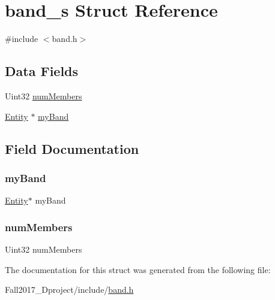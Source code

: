 \hypertarget{structband__s}{}\section{band\+\_\+s Struct Reference}
\label{structband__s}


{\ttfamily \#include $<$band.\+h$>$}

\subsection*{Data Fields}
\begin{DoxyCompactItemize}
\item 
Uint32 \hyperlink{structband__s_a9dbdd428ed64607e0c0fc9eedbf396b8}{num\+Members}
\item 
\hyperlink{entity__s_8h_a603076735282b0b83df7e6ecd290f875}{Entity} $\ast$ \hyperlink{structband__s_a4fe5b3acf1bffd136d6e49c9ad1c620d}{my\+Band}
\end{DoxyCompactItemize}


\subsection{Field Documentation}
\mbox{\label{structband__s_a4fe5b3acf1bffd136d6e49c9ad1c620d}} 
\subsubsection{\texorpdfstring{my\+Band}{myBand}}
{\footnotesize\ttfamily \hyperlink{entity__s_8h_a603076735282b0b83df7e6ecd290f875}{Entity}$\ast$ my\+Band}

\mbox{\label{structband__s_a9dbdd428ed64607e0c0fc9eedbf396b8}} 
\subsubsection{\texorpdfstring{num\+Members}{numMembers}}
{\footnotesize\ttfamily Uint32 num\+Members}



The documentation for this struct was generated from the following file\+:\begin{DoxyCompactItemize}
\item 
Fall2017\+\_\+Dproject/include/\hyperlink{band_8h}{band.\+h}\end{DoxyCompactItemize}
